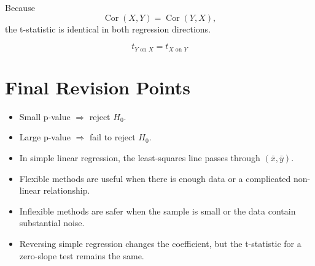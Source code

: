 \documentclass[12pt,a4paper]{article}
\begin{document}
Because
\[
\operatorname{Cor}(X,Y)=\operatorname{Cor}(Y,X),
\]
the t-statistic is identical in both regression directions.

\[
\boxed{t_{Y\text{ on }X}=t_{X\text{ on }Y}}
\]

\section*{Final Revision Points}

\begin{itemize}[leftmargin=*]
    \item Small p-value $\Rightarrow$ reject $H_0$.
    \item Large p-value $\Rightarrow$ fail to reject $H_0$.
    \item In simple linear regression, the least-squares line passes through
    $(\bar{x},\bar{y})$.
    \item Flexible methods are useful when there is enough data or a
    complicated non-linear relationship.
    \item Inflexible methods are safer when the sample is small or the data
    contain substantial noise.
    \item Reversing simple regression changes the coefficient, but the
    t-statistic for a zero-slope test remains the same.
\end{itemize}
\end{document}
